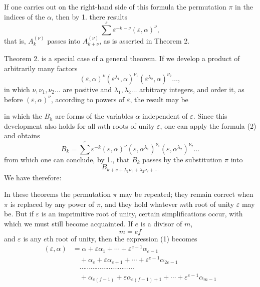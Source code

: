 
If one carries out on the right-hand side of this formula the permutation $\pi$ in the indices of the $\alpha$, then by 1. there results
\[
\sum^{\varepsilon} \varepsilon^{-k-\nu}(\varepsilon,\alpha)^{\nu},
\]
that is, $A_k^{(\nu)}$ passes into $A_{k+\nu}^{(\nu)}$, as is asserted in Theorem 2.

Theorem 2. is a special case of a general theorem. If we develop a product of arbitrarily many factors
\[
(\varepsilon,\alpha)^{\nu}(\varepsilon^{\lambda_1},\alpha)^{\nu_1}(\varepsilon^{\lambda_2},\alpha)^{\nu_2}\dots,
\]
in which $\nu, \nu_1, \nu_2\dots$ are positive and $\lambda_1, \lambda_2\dots$ arbitrary integers, and order it, as before $(\varepsilon,\alpha)^{\nu}$, according to powers of $\varepsilon$, the result may be

in which the $B_h$ are forms of the variables $\alpha$ independent of $\varepsilon$. Since this development also holds for all $m$th roots of unity $\varepsilon$, one can apply the formula (2) and obtains
\[
B_k = \sum^{\varepsilon} \varepsilon^{-k}(\varepsilon,\alpha)^{\nu}(\varepsilon,\alpha^{\lambda_1})^{\nu_1}(\varepsilon,\alpha^{\lambda_2})^{\nu_2}\dots
\]
from which one can conclude, by 1., that $B_k$ passes by the substitution $\pi$ into
\[
B_{k+\nu+\lambda_1\nu_1+\lambda_2\nu_2+\cdots}
\]
We have therefore:


In these theorems the permutation $\pi$ may be repeated; they remain correct when $\pi$ is replaced by any power of $\pi$, and they hold whatever $m$th root of unity $\varepsilon$ may be. But if $\varepsilon$ is an imprimitive root of unity, certain simplifications occur, with which we must still become acquainted. If $e$ is a divisor of $m$,
\[
m = ef
\]
and $\varepsilon$ is any $e$th root of unity, then the expression (1) becomes
\begin{align*}
(\varepsilon,\alpha) &= \alpha + \varepsilon\alpha_1 + \cdots + \varepsilon^{e-1}\alpha_{e-1}\\
&\quad + \alpha_e + \varepsilon\alpha_{e+1} + \cdots + \varepsilon^{e-1}\alpha_{2e-1}\\
&\quad \cdots\cdots\cdots\cdots\cdots\cdots\cdots\cdots\cdots\cdots\\
&\quad + \alpha_{e(f-1)} + \varepsilon\alpha_{e(f-1)+1} + \cdots + \varepsilon^{e-1}\alpha_{m-1}
\end{align*}
